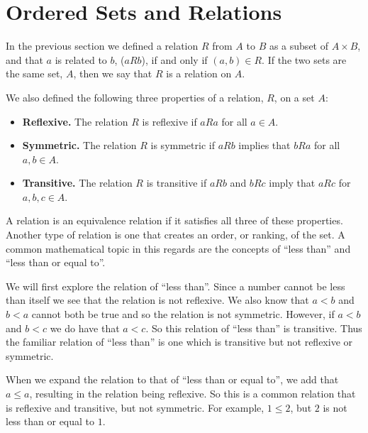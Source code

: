 \documentclass[
]{book}
\providecommand{\tightlist}{%
  \setlength{\itemsep}{0pt}\setlength{\parskip}{0pt}}
\theoremstyle{definition}
\theoremstyle{definition}
\theoremstyle{definition}
\theoremstyle{definition}
\theoremstyle{remark}
\begin{document}
\hypertarget{ordered-sets-and-relations}{%
\section{Ordered Sets and Relations}\label{ordered-sets-and-relations}}

In the previous section we defined a relation \(R\) from \(A\) to \(B\) as a subset of \(A\times B\), and that \(a\) is related to \(b\), (\(aRb\)), if and only if \((a,b)\in R\). If the two sets are the same set, \(A\), then we say that \(R\) is a relation on \(A\).

We also defined the following three properties of a relation, \(R\), on a set \(A\):

\begin{itemize}
\tightlist
\item
  \textbf{Reflexive.} The relation \(R\) is reflexive if \(aRa\) for all \(a\in A\).
\item
  \textbf{Symmetric.} The relation \(R\) is symmetric if \(aRb\) implies that \(bRa\) for all \(a,b\in A\).
\item
  \textbf{Transitive.} The relation \(R\) is transitive if \(aRb\) and \(bRc\) imply that \(aRc\) for \(a,b,c\in A\).
\end{itemize}

A relation is an equivalence relation if it satisfies all three of these properties. Another type of relation is one that creates an order, or ranking, of the set. A common mathematical topic in this regards are the concepts of ``less than'' and ``less than or equal to''.

We will first explore the relation of ``less than''. Since a number cannot be less than itself we see that the relation is not reflexive. We also know that \(a<b\) and \(b<a\) cannot both be true and so the relation is not symmetric. However, if \(a<b\) and \(b<c\) we do have that \(a<c\). So this relation of ``less than'' is transitive. Thus the familiar relation of ``less than'' is one which is transitive but not reflexive or symmetric.

When we expand the relation to that of ``less than or equal to'', we add that \(a\leq a\), resulting in the relation being reflexive. So this is a common relation that is reflexive and transitive, but not symmetric. For example, \(1\leq 2\), but \(2\) is not less than or equal to \(1\).
\end{document}
